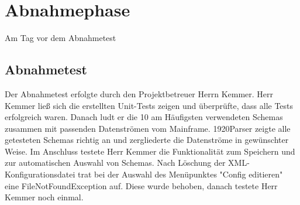 \section{Abnahmephase} 
\label{sec:Abnahmephase}
Am Tag vor dem Abnahmetest 
\subsection{Abnahmetest}
\label{sec:Abnahmetest}
Der Abnahmetest erfolgte durch den Projektbetreuer Herrn Kemmer. Herr Kemmer ließ sich die erstellten Unit-Tests zeigen und überprüfte, dass alle Tests erfolgreich waren. Danach ludt er die 10 am Häufigsten verwendeten Schemas zusammen mit passenden Datenströmen vom Mainframe. 1920Parser zeigte alle getesteten Schemas richtig an und zergliederte die Datenströme in gewünschter Weise. Im Anschluss testete Herr Kemmer die Funktionalität zum Speichern und zur automatischen Auswahl von Schemas. Nach Löschung der XML-Konfigurationsdatei trat bei der Auswahl des Menüpunktes "Config editieren" eine FileNotFoundException auf. Diese wurde behoben, danach testete Herr Kemmer noch einmal.

